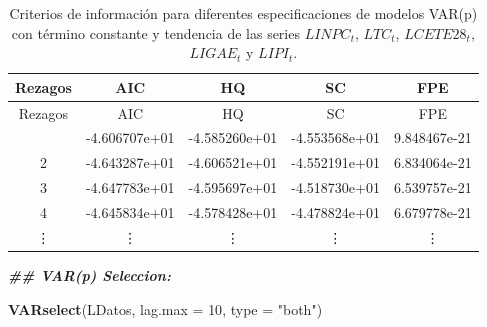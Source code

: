 \documentclass[
]{book}
\newenvironment{Shaded}{\begin{snugshade}}{\end{snugshade}}
\newcommand{\AttributeTok}[1]{\textcolor[rgb]{0.13,0.29,0.53}{#1}}
\newcommand{\DecValTok}[1]{\textcolor[rgb]{0.00,0.00,0.81}{#1}}
\newcommand{\DocumentationTok}[1]{\textcolor[rgb]{0.56,0.35,0.01}{\textbf{\textit{#1}}}}
\newcommand{\FunctionTok}[1]{\textcolor[rgb]{0.13,0.29,0.53}{\textbf{#1}}}
\newcommand{\NormalTok}[1]{#1}
\newcommand{\StringTok}[1]{\textcolor[rgb]{0.31,0.60,0.02}{#1}}
\begin{document}
\begin{longtable}[]{@{}ccccc@{}}
\caption{\label{tab:SelectVARVEC} Criterios de información para diferentes especificaciones de modelos VAR(p) con término constante y tendencia de las series \(LINPC_t\), \(LTC_t\), \(LCETE28_t\), \(LIGAE_t\) y \(LIPI_t\).}\tabularnewline
\toprule\noalign{}
Rezagos & AIC & HQ & SC & FPE \\
\midrule\noalign{}
\endfirsthead
\toprule\noalign{}
Rezagos & AIC & HQ & SC & FPE \\
\midrule\noalign{}
\endhead
\bottomrule\noalign{}
\endlastfoot
1 & -4.606707e+01 & -4.585260e+01 & -4.553568e+01 & 9.848467e-21 \\
2 & -4.643287e+01 & -4.606521e+01 & -4.552191e+01 & 6.834064e-21 \\
3 & -4.647783e+01 & -4.595697e+01 & -4.518730e+01 & 6.539757e-21 \\
4 & -4.645834e+01 & -4.578428e+01 & -4.478824e+01 & 6.679778e-21 \\
\vdots & \vdots & \vdots & \vdots & \vdots \\
\end{longtable}

\begin{Shaded}
\begin{Highlighting}[]
\DocumentationTok{\#\# VAR(p) Seleccion:}

\FunctionTok{VARselect}\NormalTok{(LDatos, }\AttributeTok{lag.max =} \DecValTok{10}\NormalTok{, }\AttributeTok{type =} \StringTok{"both"}\NormalTok{)}
\end{Highlighting}
\end{Shaded}
\end{document}
